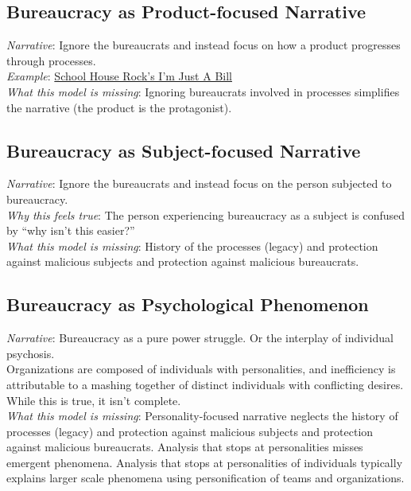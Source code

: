 \subsection*{Bureaucracy as Product-focused Narrative}
\textit{Narrative}: Ignore the bureaucrats and instead focus on how a product progresses through processes.\\
\textit{Example}: \href{https://www.youtube.com/watch?v=OgVKvqTItto}{School House Rock's I'm Just A Bill}\\
\textit{What this model is missing}: Ignoring bureaucrats involved in processes simplifies the narrative (the product is the protagonist). 

\subsection*{Bureaucracy as Subject-focused Narrative}
\textit{Narrative}: Ignore the bureaucrats and instead focus on the person subjected to bureaucracy. \\
\textit{Why this feels true}: The person experiencing bureaucracy as a subject is confused by ``why isn't this easier?''  \\
\textit{What this model is missing}: History of the processes (legacy) and protection against malicious subjects and protection against malicious bureaucrats. 


\subsection*{Bureaucracy as Psychological Phenomenon}

\textit{Narrative}: Bureaucracy as a pure power struggle. Or the interplay of individual psychosis. \\



Organizations are composed of individuals with personalities, and inefficiency is attributable to a mashing together of distinct individuals with conflicting desires.
While this is true, it isn't complete. \\
\textit{What this model is missing}: Personality-focused narrative neglects the history of processes (legacy) and protection against malicious subjects and protection against malicious bureaucrats. Analysis that stops at personalities misses emergent phenomena. Analysis that stops at personalities of individuals typically explains larger scale phenomena using personification of teams and organizations. 

